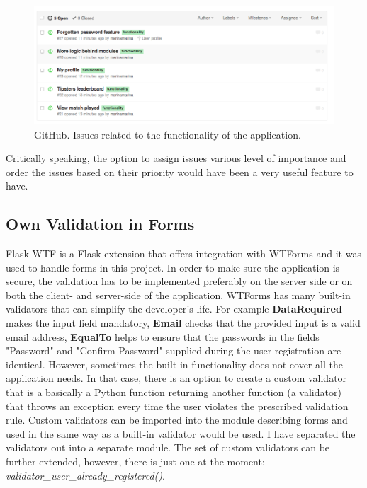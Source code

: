 \begin{figure}[H]
	\begin{center}
		\includegraphics[width=.90\textwidth]{impl/images/githubFunctionalityIssues}
		\caption{GitHub. Issues related to the functionality of the application.} \label{fig:using:githubfunctionalityissues}
	\end{center}
\end{figure}

Critically speaking, the option to assign issues various level of importance and order the issues based on their priority would have been a very useful feature to have.

\subsection{Own Validation in Forms}
\label{subsec:validations}
Flask-WTF is a Flask extension that offers integration with WTForms and it was used to handle forms in this project. In order to make sure the application is secure, the validation has to be implemented preferably on the server side or on both the client- and server-side of the application. WTForms has many built-in validators that can simplify the developer's life. For example \textbf{DataRequired} makes the input field mandatory, \textbf{Email} checks that the provided input is a valid email address, \textbf{EqualTo} helps to ensure that the passwords in the fields "Password" and "Confirm Password" supplied during the user registration are identical. However, sometimes the built-in functionality does not cover all the application needs. In that case, there is an option to create a custom validator that is a basically a Python function returning another function (a validator) that throws an exception every time the user violates the prescribed validation rule. Custom validators can be imported into the module describing forms and used in the same way as a built-in validator would be used. I have separated the validators out into a separate module. The set of custom validators can be further extended, however, there is just one at the moment: \emph{validator\_user\_already\_registered()}.

